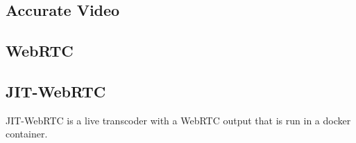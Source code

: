 \documentclass[12pt,a4paper]{article}
\begin{document}
\subsection{Accurate Video} \label{subsection_accuratevideo}

\cite{RM_Frontend}


\subsection{WebRTC}



\subsection{JIT-WebRTC}

JIT-WebRTC is a live transcoder with a WebRTC output that is run in a docker container. \cite{RM_Backend}
\end{document}

